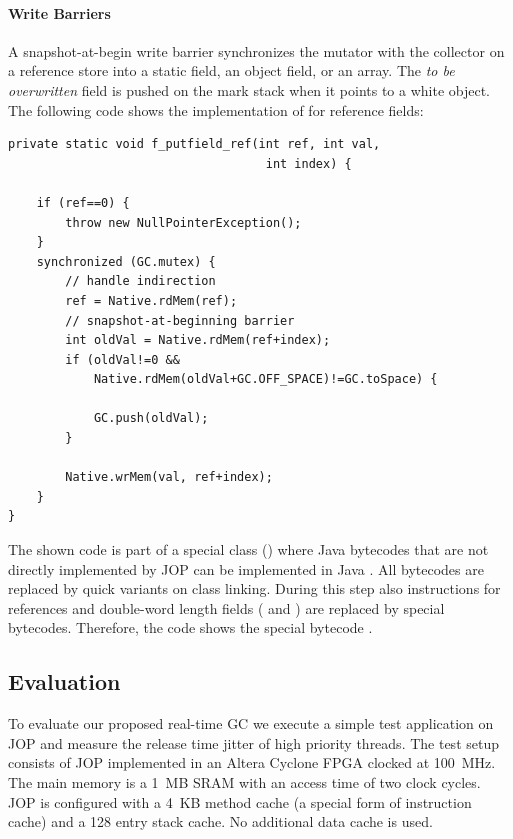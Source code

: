 \paragraph{Write Barriers}

A snapshot-at-begin write barrier synchronizes the mutator with the
collector on a reference store into a static field, an object field,
or an array. The \emph{to be overwritten} field is pushed on the
mark stack when it points to a white object. The following code
shows the implementation of  for reference fields:

{\small
\begin{verbatim}
private static void f_putfield_ref(int ref, int val,
                                    int index) {

    if (ref==0) {
        throw new NullPointerException();
    }
    synchronized (GC.mutex) {
        // handle indirection
        ref = Native.rdMem(ref);
        // snapshot-at-beginning barrier
        int oldVal = Native.rdMem(ref+index);
        if (oldVal!=0 &&
            Native.rdMem(oldVal+GC.OFF_SPACE)!=GC.toSpace) {

            GC.push(oldVal);
        }

        Native.wrMem(val, ref+index);
    }
}
\end{verbatim}
}

The shown code is part of a special class ()
where Java bytecodes that are not directly implemented by JOP can be
implemented in Java \cite{jop:thesis}. All  bytecodes are
replaced by quick variants on class linking. During this step also
 instructions for references and double-word length fields
( and ) are replaced by special
bytecodes. Therefore, the code shows the special bytecode
.



\subsection{Evaluation}

To evaluate our proposed real-time GC we execute a simple test
application on JOP and measure the release time jitter of high
priority threads. The test setup consists of JOP implemented in an
Altera Cyclone FPGA clocked at 100~MHz. The main memory is a 1~MB
SRAM with an access time of two clock cycles. JOP is configured with
a 4~KB method cache (a special form of instruction cache) and a 128
entry stack cache. No additional data cache is used.

